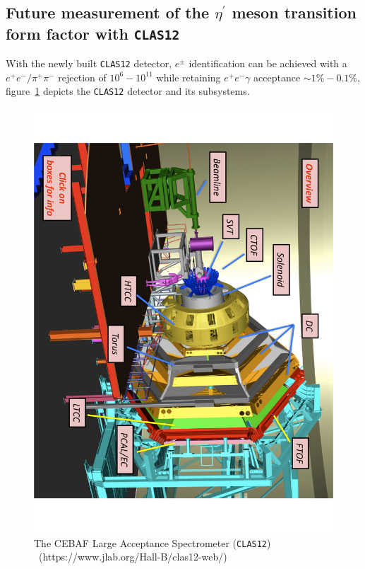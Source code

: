 \documentclass{aip-cp}
\begin{document}
\subsection{Future measurement of the $\eta^\prime$ meson transition form factor with \textsc{\texttt{CLAS12}}}
With the newly built \textsc{\texttt{CLAS12}} detector, $e^{\pm}$ identification can be achieved with a $e^{+}e^{-}/\pi^{+}\pi^{-}$ rejection of  $10^{6}-10^{11}$ while retaining $e^+ e^- \gamma$ acceptance $\sim 1 \% - 0.1 \%$, figure~\ref{fig:clas12} depicts the \textsc{\texttt{CLAS12}} detector and its subsystems.
\begin{figure}[h!]
	\centerline{\includegraphics[angle = 90,width=250 pt]{figures/clas12-design.pdf}}
	\caption{The CEBAF Large Acceptance Spectrometer (\textsc{\texttt{CLAS12}})\\~(https://www.jlab.org/Hall-B/clas12-web/)}
	\label{fig:clas12}
\end{figure}
\end{document}
